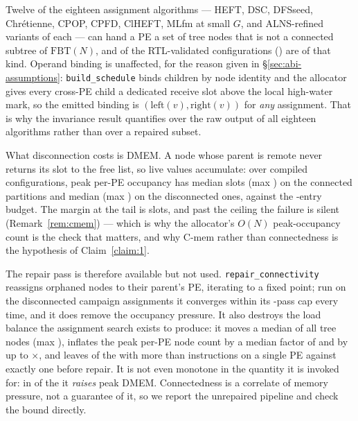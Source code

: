 \documentclass[journal,10pt]{IEEEtran}
\theoremstyle{plain}
\theoremstyle{definition}
\theoremstyle{remark}
\newcommand{\FBT}{\ensuremath{\mathrm{FBT}}}
\newcommand{\sv}[1]{\texttt{#1}}
\begin{document}
Twelve of the eighteen assignment algorithms --- HEFT, DSC, DFSseed,
Chr\'etienne, CPOP, CPFD, ClHEFT, MLfm at small $G$, and ALNS-refined
variants of each --- can hand a PE a set of tree nodes that is not a
connected subtree of $\FBT(N)$, and \DisconnCount{} of the \WallTBs{}
RTL-validated configurations (\DisconnShare{}) are of that kind. Operand
binding is unaffected, for the reason given in \S\ref{sec:abi-assumptions}:
\sv{build\_schedule} binds children by node identity and the allocator gives
every cross-PE child a dedicated receive slot above the local high-water
mark, so the emitted binding is $(\mathrm{left}(v), \mathrm{right}(v))$ for
\emph{any} assignment. That is why the invariance result quantifies over the
raw output of all eighteen algorithms rather than over a repaired subset.

What disconnection costs is DMEM. A node whose parent is remote never
returns its slot to the free list, so live values accumulate: over
\BindConfigs{} compiled configurations, peak per-PE occupancy has median
\DmemMedConn{} slots (max \DmemMaxConn) on the \DmemConnConfigs{} connected
partitions and median \DmemMedDisc{} (max \DmemPeakMax) on the
\DmemDiscConfigs{} disconnected ones, against the \DmemDepth-entry budget.
The margin at the tail is \DmemMargin{} slots, and past the ceiling the
failure is silent (Remark~\ref{rem:cmem}) --- which is why the allocator's
$O(N)$ peak-occupancy count is the check that matters, and why
\textsf{C-mem} rather than connectedness is the hypothesis of
Claim~\ref{claim:1}.

The repair pass is therefore available but not used. \sv{repair\_connectivity}
reassigns orphaned nodes to their parent's PE, iterating to a fixed point;
run on the \DmemDiscConfigs{} disconnected campaign assignments it converges
within its \RepairPasses-pass cap every time, and it does remove the
occupancy pressure. It also destroys the load balance the assignment search
exists to produce: it moves a median \RepairMovedMed{} of all tree nodes
(max \RepairMovedMax), inflates the peak per-PE node count by a median
factor of \RepairLoadMed{} and by up to \RepairLoadMax$\times$, and leaves
\RepairImemOver{} of the \DmemDiscConfigs{} with more than \DmemDepth{}
instructions on a single PE against exactly one before repair. It is not
even monotone in the quantity it is invoked for: in \RepairDmemUp{} of the
\DmemDiscConfigs{} it \emph{raises} peak DMEM. Connectedness is a correlate
of memory pressure, not a guarantee of it, so we report the unrepaired
pipeline and check the bound directly.
\end{document}
